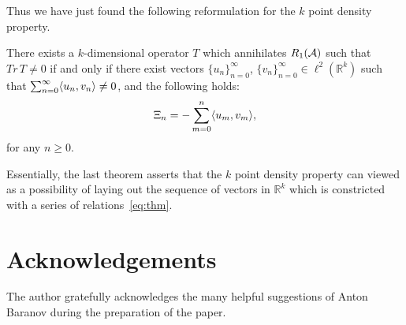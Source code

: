 \documentclass[12pt]{amsart}
\theoremstyle{case}
\begin{document}
  Thus we have just found the following reformulation for the $k$ point density property.
  \begin{prop}
    \label{prop:kreformulation}
    There exists a $k$-dimensional operator $T$ which annihilates $R_1(\cal{A})$
      such that $Tr\, T \neq 0$ if and only if
      there exist vectors $\{u_n\}_{n=0}^\infty$, $\{v_n\}_{n=0}^\infty\in \ell^2(\mathbb{R}^k)$ such that
      $\sum_{n=0}^\infty \inner{u_n}{v_n} \neq 0$, and the following holds:
      \begin{equation}
        \label{eq:thm}
        \Xi_n = -\sum_{m=0}^n \inner{u_m}{v_m},
      \end{equation}
      for any $n \geq 0$.
  \end{prop}
  Essentially, the last theorem asserts that the $k$ point density property can viewed as a
    possibility of laying out the sequence of vectors in $\mathbb{R}^k$ which is constricted with
    a series of relations~\eqref{eq:thm}.



\section{Acknowledgements}
  The author gratefully acknowledges the many helpful suggestions of Anton Baranov during the preparation of the paper.


\end{document}
